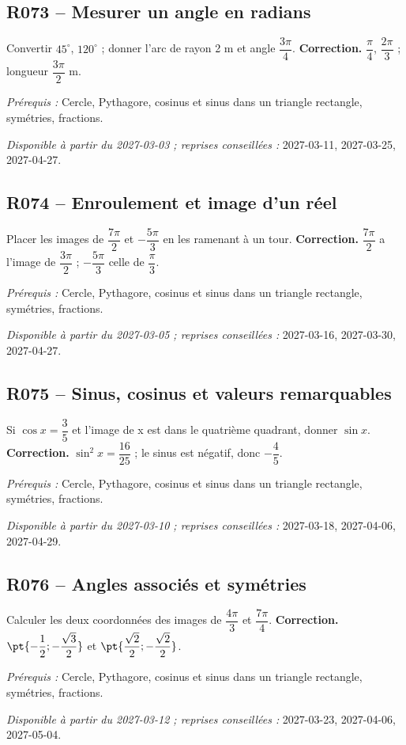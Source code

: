 \subsection*{R073 -- Mesurer un angle en radians}\label{R073}
Convertir $45^\circ$, $120^\circ$ ; donner l’arc de rayon 2 m et angle $\dfrac{3\pi}{4}$.
\ifmxteacher\textbf{Correction.} $\dfrac{\pi}{4}$, $\dfrac{2\pi}{3}$ ; longueur $\dfrac{3\pi}{2}$ m.\par\textit{Prérequis :} Cercle, Pythagore, cosinus et sinus dans un triangle rectangle, symétries, fractions.\par\textit{Disponible à partir du 2027-03-03 ; reprises conseillées :} 2027-03-11, 2027-03-25, 2027-04-27.\fi
{}\subsection*{R074 -- Enroulement et image d’un réel}\label{R074}
Placer les images de $\dfrac{7\pi}{2}$ et $-\dfrac{5\pi}{3}$ en les ramenant à un tour.
\ifmxteacher\textbf{Correction.} $\dfrac{7\pi}{2}$ a l’image de $\dfrac{3\pi}{2}$ ; $-\dfrac{5\pi}{3}$ celle de $\dfrac{\pi}{3}$.\par\textit{Prérequis :} Cercle, Pythagore, cosinus et sinus dans un triangle rectangle, symétries, fractions.\par\textit{Disponible à partir du 2027-03-05 ; reprises conseillées :} 2027-03-16, 2027-03-30, 2027-04-27.\fi
{}\subsection*{R075 -- Sinus, cosinus et valeurs remarquables}\label{R075}
Si $\cos x=\dfrac{3}{5}$ et l’image de x est dans le quatrième quadrant, donner $\sin x$.
\ifmxteacher\textbf{Correction.} $\sin ^2x=\dfrac{16}{25}$ ; le sinus est négatif, donc $-\dfrac{4}{5}$.\par\textit{Prérequis :} Cercle, Pythagore, cosinus et sinus dans un triangle rectangle, symétries, fractions.\par\textit{Disponible à partir du 2027-03-10 ; reprises conseillées :} 2027-03-18, 2027-04-06, 2027-04-29.\fi
{}\subsection*{R076 -- Angles associés et symétries}\label{R076}
Calculer les deux coordonnées des images de $\dfrac{4\pi}{3}$ et $\dfrac{7\pi}{4}$.
\ifmxteacher\textbf{Correction.} $\pt{-\dfrac{1}{2};-\dfrac{\sqrt 3}{2}}$ et $\pt{\dfrac{\sqrt 2}{2};-\dfrac{\sqrt 2}{2}}$.\par\textit{Prérequis :} Cercle, Pythagore, cosinus et sinus dans un triangle rectangle, symétries, fractions.\par\textit{Disponible à partir du 2027-03-12 ; reprises conseillées :} 2027-03-23, 2027-04-06, 2027-05-04.\fi
